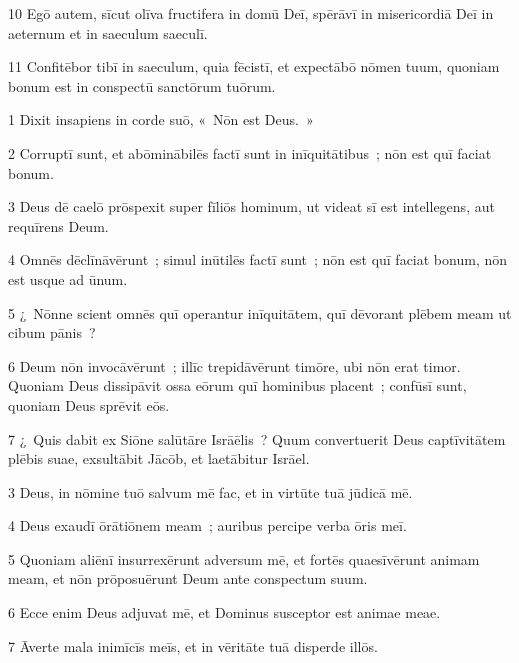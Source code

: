 \psalmVerse
  {\phantom{0}10}
  {Egō autem, sīcut olīva fructifera in domū Deī, spērāvī in misericordiā Deī in aeternum et in saeculum saeculī.}


\psalmVerse
  {\phantom{0}11}
  {Confitēbor tibī in saeculum, quia fēcistī, et expectābō nōmen tuum, quoniam bonum est in conspectū sanctōrum tuōrum.}



\psalmVerse
  {\phantom{00}1}
  {Dixit insapiens in corde suō, «~Nōn est Deus.~»}


\psalmVerse
  {\phantom{00}2}
  {Corruptī sunt, et abōminābilēs factī sunt in inīquitātibus~; nōn est quī faciat bonum.}


\psalmVerse
  {\phantom{00}3}
  {Deus dē caelō prōspexit super fīliōs hominum, ut videat sī est intellegens, aut requīrens Deum.}


\psalmVerse
  {\phantom{00}4}
  {Omnēs dēclīnāvērunt~; simul inūtilēs factī sunt~; nōn est quī faciat bonum, nōn est usque ad ūnum.}


\psalmVerse
  {\phantom{00}5}
  {¿~Nōnne scient omnēs quī operantur inīquitātem, quī dēvorant plēbem meam ut cibum pānis~?}


\psalmVerse
  {\phantom{00}6}
  {Deum nōn invocāvērunt~; illīc trepidāvērunt timōre, ubi nōn erat timor. Quoniam Deus dissipāvit ossa eōrum quī hominibus placent~; confūsī sunt, quoniam Deus sprēvit eōs.}


\psalmVerse
  {\phantom{00}7}
  {¿~Quis dabit ex Siōne salūtāre Isrāēlis~? Quum convertuerit Deus captīvitātem plēbis suae, exsultābit Jācōb, et laetābitur Isrāel.}



\psalmVerse
  {\phantom{00}3}
  {Deus, in nōmine tuō salvum mē fac, et in virtūte tuā jūdicā mē.}


\psalmVerse
  {\phantom{00}4}
  {Deus exaudī ōrātiōnem meam~; auribus percipe verba ōris meī.}


\psalmVerse
  {\phantom{00}5}
  {Quoniam aliēnī insurrexērunt adversum mē, et fortēs quaesīvērunt animam meam, et nōn prōposuērunt Deum ante conspectum suum.}


\psalmVerse
  {\phantom{00}6}
  {Ecce enim Deus adjuvat mē, et Dominus susceptor est animae meae.}


\psalmVerse
  {\phantom{00}7}
  {Āverte mala inimīcīs meīs, et in vēritāte tuā disperde illōs.}


